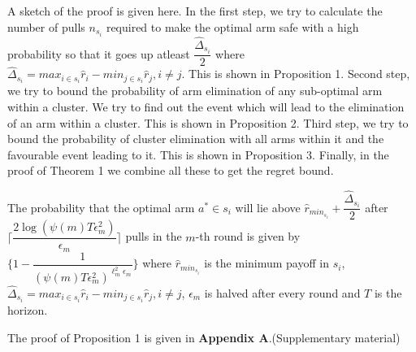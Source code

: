 \begin{remark}
A sketch of the proof is given here. In the first step, we try to calculate the number of pulls $n_{s_{i}}$ required to make the optimal arm  safe with a high probability so that it goes up atleast $\dfrac{\hat{\Delta}_{s_{i}}}{2}$ where $\hat{\Delta}_{s_{i}}=max_{i\in s_{i}}\hat{r}_{i}-min_{j\in s_{i}}\hat{r}_{j},i\neq j$. This is shown in Proposition 1. Second step, we try to bound the probability of arm elimination of any sub-optimal arm within a cluster. We try to find out the event which will lead to the elimination of an arm within a cluster. This is shown in Proposition 2. Third step, we try to bound the probability of cluster elimination with all arms within it and the favourable event leading to it. This is shown in Proposition 3. Finally, in the proof of Theorem 1 we combine all these to get the regret bound.  
\end{remark}
	
\begin{proposition}
The probability that the optimal arm $a^{*}\in s_{i}$ will lie above $\hat{r}_{min_{s_{i}}}+ \dfrac{\hat{\Delta}_{s_{i}}}{2}$ after $\bigg\lceil\dfrac{2\log (\psi(m)T\epsilon_{m}^{2})}{\epsilon_{m}}\bigg\rceil$ pulls in the $m$-th round is given by $\bigg\lbrace 1- \dfrac{1}{(\psi(m)T\epsilon_{m}^{2})^{\ell_{m}^{2}\epsilon_{m}}} \bigg\rbrace$ where $\hat{r}_{min_{s_{i}}}$ is the minimum payoff in $s_{i}$, $\hat{\Delta}_{s_{i}}=max_{i\in s_{i}}\hat{r}_{i}-min_{j\in s_{i}}\hat{r}_{j}, i\neq j$, $\epsilon_{m}$ is halved after every round and $T$ is the horizon. 
\end{proposition}


	The proof of Proposition 1 is given in \textbf{Appendix A}.(Supplementary material)


